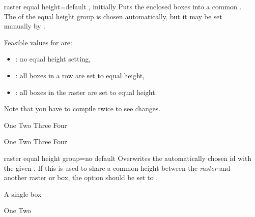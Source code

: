\clearpage
\begin{docTcbKey}[][doc new=2014-11-10]{raster equal height}{=}{default , initially }
  Puts the enclosed boxes into a common .
  The  of the equal height group is chosen automatically, but
  it may be set manually by .

  Feasible values for  are:
  \begin{itemize}
  \item{}: no equal height setting,
  \item{}: all boxes in a row are set to equal height,
  \item{}: all boxes in the raster are set to equal height.
  \end{itemize}
  Note that you have to compile twice to see changes.

\begin{dispExample}
\begin{tcbitemize}[raster equal height=rows,
  size=small,colframe=red!50!black,colback=red!10!white]
  \tcbitem One
  \tcbitem \Huge Two
  \tcbitem Three
  \tcbitem Four
\end{tcbitemize}
\end{dispExample}
\begin{dispExample}
\begin{tcbitemize}[raster equal height,
  size=small,colframe=red!50!black,colback=red!10!white]
  \tcbitem One
  \tcbitem \Huge Two
  \tcbitem Three
  \tcbitem Four
\end{tcbitemize}
\end{dispExample}
\end{docTcbKey}


\begin{docTcbKey}[][doc new=2014-11-10]{raster equal height group}{=}{no default}
  Overwrites the automatically chosen id with the given .
  If this is used to share a common height between the \emph{raster} and
  another raster or box, the  option
  should be set to .
\begin{dispExample}
\begin{tcolorbox}[equal height group=raster-manual-id]
  A single box
\end{tcolorbox}
\begin{tcbitemize}[raster equal height,raster equal height group=raster-manual-id]
  \tcbitem One
  \tcbitem \Huge Two
\end{tcbitemize}
\end{dispExample}
\end{docTcbKey}


